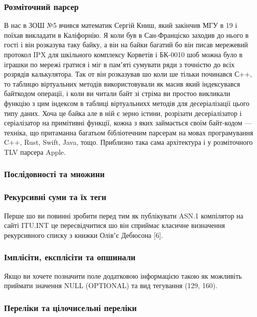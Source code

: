 \subsubsection{Розміточний парсер}

В нас в ЗОШ №5 вчився математик Сергій Книш, який закінчив МГУ в 19 і поїхав викладати в Каліфорнію. Я коли був в Сан-Франціско заходив до нього в гості і він розказува таку байку, а він на байки багатий бо він писав мережевий протокол IPX для шкільного комплексу Корветів і БК-0010 шоб можна було в іграшки по мережі гратися і міг в памʼяті сумувати ряди з точністю до всіх розрядів калькулятора. Так от він розказував шо коли ше тільки починався С++, то таблицю віртуальних методів використовували як масив який індексувався байткодом операції, і коли ви читали байт зі стріма ви простоо викликали функцію з цим індексом в таблиці віртуальнихх методів для десеріалізації цього типу даних. Хоча це байка але в ній є зерно істини, розрізати десеріалізатор і серіалізатор на примітивні функції, кожна з яких займається своїм байт-кодом — техніка, що притаманна багатьом бібліотечним парсерам на мовах програмування C++, Rust, Swift, Java, тощо. Приблизно така сама архітектура і у розміточного TLV парсера Apple.

\subsubsection{Послідовності та множини}

\subsubsection{Рекурсивні суми та їх теги}

Перше шо ви повинні зробити перед тим як публікувати ASN.1 компілятор на сайті ITU.INT це пересвідчитися шо він сприймає класичне визначення рекурсивного списку з книжки Олівʼє Дебюсона [6].

\subsubsection{Імплісіти, експлісіти та опшинали}

Якщо ви хочете позначити поле додатковою інформацією такою як можливіть приймати значення NULL (OPTIONAL) та вид тегування (129, 160).

\subsubsection{Переліки та цілочисельні переліки}

